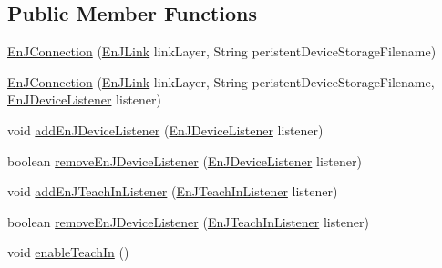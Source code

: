 \subsection*{Public Member Functions}
\begin{DoxyCompactItemize}
\item 
\hyperlink{classit_1_1polito_1_1elite_1_1enocean_1_1enj_1_1communication_1_1_en_j_connection_a1d4409206c2eb68c50d5314df51a535d}{En\+J\+Connection} (\hyperlink{classit_1_1polito_1_1elite_1_1enocean_1_1enj_1_1link_1_1_en_j_link}{En\+J\+Link} link\+Layer, String peristent\+Device\+Storage\+Filename)
\item 
\hyperlink{classit_1_1polito_1_1elite_1_1enocean_1_1enj_1_1communication_1_1_en_j_connection_a02d2c16708da5b40dea825a96e8d21e6}{En\+J\+Connection} (\hyperlink{classit_1_1polito_1_1elite_1_1enocean_1_1enj_1_1link_1_1_en_j_link}{En\+J\+Link} link\+Layer, String peristent\+Device\+Storage\+Filename, \hyperlink{interfaceit_1_1polito_1_1elite_1_1enocean_1_1enj_1_1communication_1_1_en_j_device_listener}{En\+J\+Device\+Listener} listener)
\item 
void \hyperlink{classit_1_1polito_1_1elite_1_1enocean_1_1enj_1_1communication_1_1_en_j_connection_a367e344745b5e78c8abfd5814551df40}{add\+En\+J\+Device\+Listener} (\hyperlink{interfaceit_1_1polito_1_1elite_1_1enocean_1_1enj_1_1communication_1_1_en_j_device_listener}{En\+J\+Device\+Listener} listener)
\item 
boolean \hyperlink{classit_1_1polito_1_1elite_1_1enocean_1_1enj_1_1communication_1_1_en_j_connection_afdd6f3068dab1cd68d0e4b6d3ad980cf}{remove\+En\+J\+Device\+Listener} (\hyperlink{interfaceit_1_1polito_1_1elite_1_1enocean_1_1enj_1_1communication_1_1_en_j_device_listener}{En\+J\+Device\+Listener} listener)
\item 
void \hyperlink{classit_1_1polito_1_1elite_1_1enocean_1_1enj_1_1communication_1_1_en_j_connection_a01fd31c05d9a0e262746116086ff2f4a}{add\+En\+J\+Teach\+In\+Listener} (\hyperlink{interfaceit_1_1polito_1_1elite_1_1enocean_1_1enj_1_1communication_1_1_en_j_teach_in_listener}{En\+J\+Teach\+In\+Listener} listener)
\item 
boolean \hyperlink{classit_1_1polito_1_1elite_1_1enocean_1_1enj_1_1communication_1_1_en_j_connection_a52a60ea9eea1b5e6992e553ccc436dc5}{remove\+En\+J\+Device\+Listener} (\hyperlink{interfaceit_1_1polito_1_1elite_1_1enocean_1_1enj_1_1communication_1_1_en_j_teach_in_listener}{En\+J\+Teach\+In\+Listener} listener)
\item 
void \hyperlink{classit_1_1polito_1_1elite_1_1enocean_1_1enj_1_1communication_1_1_en_j_connection_a6b7c48b7500c28ec6afbf1840031b3ee}{enable\+Teach\+In} ()

\end{DoxyCompactItemize}
